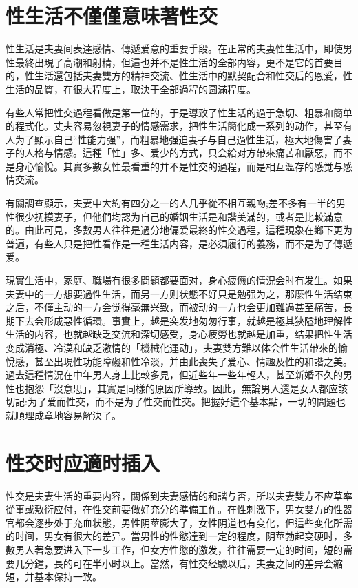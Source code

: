 \documentclass[12pt,UTF8]{ctexbook}
\begin{document}
\section{性生活不僅僅意味著性交}

性生活是夫妻间表達感情、傳遞爱意的重要手段。在正常的夫妻性生活中，即使男性最終出現了高潮和射精，但這也并不是性生活的全部内容，更不是它的首要目的，性生活還包括夫妻雙方的精神交流、性生活中的默契配合和性交后的恩爱，性生活的品質，在很大程度上，取決于全部過程的圆滿程度。

有些人常把性交過程看做是第一位的，于是導致了性生活的過于急切、粗暴和簡单的程式化。丈夫容易忽視妻子的情感需求，把性生活簡化成一系列的动作，甚至有人为了顯示自己“性能力强”，而粗暴地强迫妻子与自己過性生活，極大地傷害了妻子的人格与情感。這種「性」多、爱少的方式，只会給对方帶來痛苦和厭惡，而不是身心愉悅。其實多數女性最看重的并不是性交的過程，而是相互溫存的感觉与感情交流。

有關調查顯示，夫妻中大約有四分之一的人几乎從不相互親吻;差不多有一半的男性很少抚摸妻子，但他們均認为自己的婚姻生活是和諧美滿的，或者是比較滿意的。由此可見，多數男人往往是過分地偏爱最終的性交過程，這種現象在鄉下更为普遍，有些人只是把性看作是一種生活内容，是必須履行的義務，而不是为了傳遞爱。

現實生活中，家庭、職場有很多問題都要面对，身心疲憊的情況会时有发生。如果夫妻中的一方想要過性生活，而另一方则状態不好只是勉强为之，那麼性生活结束之后，不僅主动的一方会觉得毫無兴致，而被动的一方也会更加難過甚至痛苦，長期下去会形成惡性循環。事實上，越是突发地匆匆行事，就越是極其狹隘地理解性生活的内容，也就越缺乏交流和深切感受，身心疲勞也就越是加重，结果把性生活变成消極、冷漠和缺乏激情的「機械化運动」，夫妻雙方難以体会性生活帶來的愉悅感，甚至出現性功能障礙和性冷淡，并由此喪失了爱心、情趣及性的和諧之美。過去這種情況在中年男人身上比較多見，但近些年一些年輕人，甚至新婚不久的男性也抱怨「沒意思」，其實是同樣的原因所導致。因此，無論男人還是女人都应該切記:为了爱而性交，而不是为了性交而性交。把握好這个基本點，一切的問題也就順理成章地容易解決了。

\section{性交时应適时插入}

性交是夫妻生活的重要内容，關係到夫妻感情的和諧与否，所以夫妻雙方不应草率從事或敷衍应付，在性交前要做好充分的準備工作。在性刺激下，男女雙方的性器官都会逐步处于充血状態，男性阴莖膨大了，女性阴道也有变化，但這些变化所需的时间，男女有很大的差异。當男性的性慾達到一定的程度，阴莖勃起变硬时，多數男人著急要进入下一步工作，但女方性慾的激发，往往需要一定的时间，短的需要几分鐘，長的可在半小时以上。當然，有性交经驗以后，夫妻之间的差异会縮短，并基本保持一致。
\end{document}
